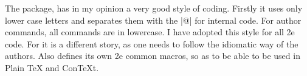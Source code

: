 The \pgf package, has in my opinion a very good style of coding. Firstly it uses only lower case letters and separates them with the |@| for internal code. For author commands, all commands are in lowercase. I have adopted this style for all \latex2e code. For  it is a different story, as one needs to follow the idiomatic way of the  authors. Also \pgfname defines its own \latex2e common macros, so as to be able to be used in Plain TeX and ConTeXt. 













